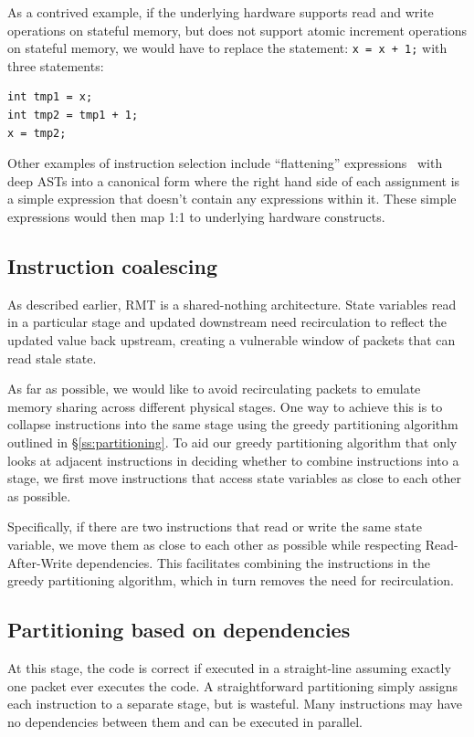 As a contrived example, if the underlying hardware supports read and write
operations on stateful memory, but does not support atomic increment operations
on stateful memory, we would have to replace the statement: \texttt{x = x + 1;}
with three statements:
\begin{verbatim}
int tmp1 = x;
int tmp2 = tmp1 + 1;
x = tmp2;
\end{verbatim}

Other examples of instruction selection include ``flattening''
expressions~\cite{expression_flattening} with deep ASTs into a canonical form
where the right hand side of each assignment is a simple expression that
doesn't contain any expressions within it. These simple expressions would then
map 1:1 to underlying hardware constructs.

\subsection{Instruction coalescing}

As described earlier, RMT is a shared-nothing architecture. State variables
read in a particular stage and updated downstream need recirculation to reflect
the updated value back upstream, creating a vulnerable window of packets that
can read stale state.

As far as possible, we would like to avoid recirculating packets to emulate
memory sharing across different physical stages. One way to achieve this is to
collapse instructions into the same stage using the greedy partitioning
algorithm outlined in \S\ref{ss:partitioning}. To aid our greedy partitioning
algorithm that only looks at adjacent instructions in deciding whether to
combine instructions into a stage, we first move instructions that access state
variables as close to each other as possible.

Specifically, if there are two instructions that read or write the same state
variable, we move them as close to each other as possible while respecting
Read-After-Write dependencies. This facilitates combining the instructions in
the greedy partitioning algorithm, which in turn removes the need for
recirculation.

\subsection{Partitioning based on dependencies}

At this stage, the code is correct if executed in a straight-line assuming
exactly one packet ever executes the code. A straightforward partitioning
simply assigns each instruction to a separate stage, but is wasteful. Many
instructions may have no dependencies between them and can be executed in
parallel.

